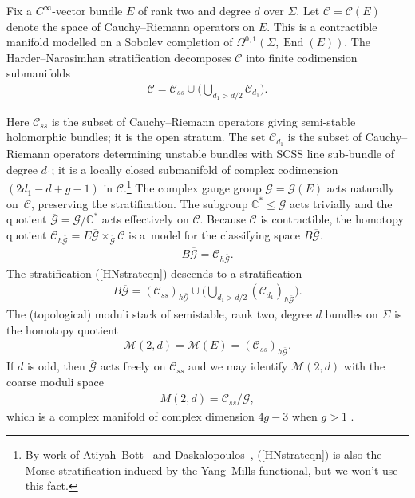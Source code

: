 \documentclass[pdftex]{sigma}
\numberwithin{equation}{section}
\begin{document}
Fix a $C^{\infty}$-vector bundle $E$ of rank two and degree $d$ over $\Sigma$. Let ${\mathcal C} ={\mathcal C}(E)$ denote the space of Cauchy--Riemann operators on $E$. This is a contractible manifold modelled on a Sobolev completion of $\Omega^{0,1}(\Sigma,\operatorname{End}(E))$. The Harder--Narasimhan stratif\/ication decomposes ${\mathcal C}$ into f\/inite codimension submanifolds
\begin{gather}\label{HNstrateqn}
 {\mathcal C} = {\mathcal C}_{ss} \cup \bigg( \bigcup_{d_1 > d/2} {\mathcal C}_{d_1}\bigg).
\end{gather}

Here ${\mathcal C}_{ss}$ is the subset of Cauchy--Riemann operators giving semi-stable holomorphic bundles; it is the open stratum. The set ${\mathcal C}_{d_1}$ is the subset of Cauchy--Riemann operators determining unstable bundles with SCSS line sub-bundle of degree $d_1$; it is a locally closed submanifold of complex codimension $(2d_1-d+g-1)$ in ${\mathcal C}$.\footnote{By work of Atiyah--Bott~\cite{AB} and Daskalopoulos~\cite{D}, (\ref{HNstrateqn}) is also the Morse stratif\/ication induced by the Yang--Mills functional, but we won't use this fact.} The complex gauge group ${\mathcal G} = {\mathcal G}(E)$ acts naturally on~${\mathcal C}$, preserving the stratif\/ication. The subgroup ${\mathbb C}^* \leq {\mathcal G}$ acts trivially and the quotient $\overline{{\mathcal G}} = {\mathcal G}/{\mathbb C}^*$ acts ef\/fectively on ${\mathcal C}$. Because ${\mathcal C}$ is contractible, the homotopy quotient $ {\mathcal C}_{h\overline{{\mathcal G}}}= E\overline{{\mathcal G}} \times_{\overline{{\mathcal G}}} {\mathcal C}$ is a~model for the classifying space $B \overline{{\mathcal G}}$.
\begin{gather*} B\overline{{\mathcal G}} = {\mathcal C}_{h\overline{{\mathcal G}}}.\end{gather*}
The stratif\/ication (\ref{HNstrateqn}) descends to a stratif\/ication
\begin{gather}\label{HNstratquot}
 B\overline{{\mathcal G}} = ({\mathcal C}_{ss})_{{h\overline{{\mathcal G}}} } \cup \bigg( \bigcup_{d_1 > d/2} ({\mathcal C}_{d_1})_{{h\overline{{\mathcal G}}} } \bigg).
\end{gather}
The (topological) moduli stack of semistable, rank two, degree $d$ bundles on $\Sigma$ is the homotopy quotient
\begin{gather*} {\mathcal M}(2,d) = {\mathcal M}(E) = ({\mathcal C}_{ss})_{{h\overline{{\mathcal G}}} } .\end{gather*}
If $d$ is odd, then $\overline{{\mathcal G}}$ acts freely on ${\mathcal C}_{ss}$ and we may identify $ {\mathcal M}(2,d)$ with the coarse moduli space \begin{gather*}M(2,d) = {\mathcal C}_{ss}/\overline{{\mathcal G}},\end{gather*} which is a complex manifold of complex dimension $4g-3$ when $g>1$ .
\end{document}
